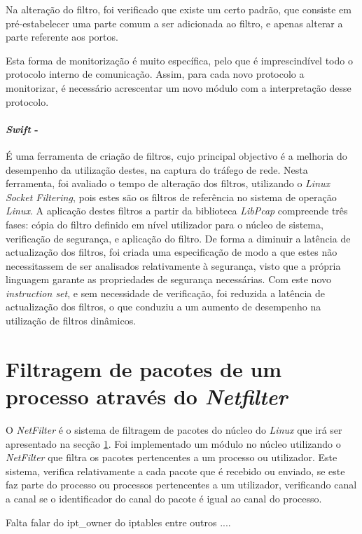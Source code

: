 Na alteração do filtro, foi verificado que existe um certo padrão, que consiste em pré-estabelecer uma parte comum a ser adicionada ao filtro, e apenas alterar a parte referente aos portos.

Esta forma de monitorização é muito específica, pelo que é imprescindível todo o protocolo interno de comunicação.
Assim, para cada novo protocolo a monitorizar, é necessário acrescentar um novo módulo com a interpretação desse protocolo.


\paragraph*{\textit{Swift} - }
É uma ferramenta de criação de filtros, cujo principal objectivo é a melhoria do desempenho da utilização destes, na captura do tráfego de rede.
Nesta ferramenta, foi avaliado o tempo de alteração dos filtros, utilizando o \textit{Linux Socket Filtering}, pois estes são os filtros de referência no sistema de operação \textit{Linux}.
A aplicação destes filtros a partir da biblioteca \textit{LibPcap} compreende três fases: cópia do filtro definido em nível utilizador para o núcleo de sistema, verificação de segurança, e aplicação do filtro.
De forma a diminuir a latência de actualização dos filtros, foi criada uma especificação de modo a que estes não necessitassem de ser analisados relativamente à segurança, visto que a própria linguagem garante as propriedades de segurança necessárias.
Com este novo \textit{instruction set}, e sem necessidade de verificação, foi reduzida a latência de actualização dos filtros, o que conduziu a um aumento de desempenho na utilização de filtros dinâmicos.



\section{Filtragem de pacotes de um processo através do \textit{Netfilter}}

O \textit{NetFilter} é o sistema de filtragem de pacotes do núcleo do \textit{Linux} que irá ser apresentado na secção \ref{}.
Foi implementado um módulo no núcleo utilizando o \textit{NetFilter} que filtra os pacotes pertencentes a um processo ou utilizador.
Este sistema, verifica relativamente a cada pacote que é recebido ou enviado, se este faz parte do processo ou processos pertencentes a um utilizador, verificando canal a canal se o identificador do canal do pacote é igual ao canal do processo.


Falta falar do ipt\_owner do iptables entre outros ....

